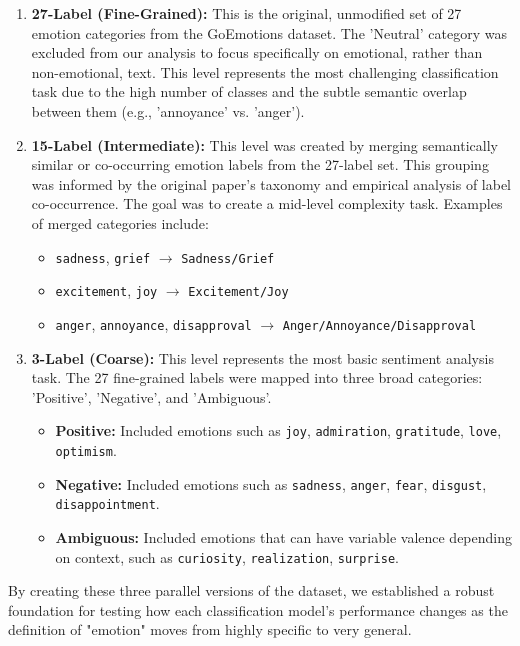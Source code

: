 \begin{enumerate}
    \item \textbf{27-Label (Fine-Grained):} This is the original, unmodified set of 27 emotion categories from the GoEmotions dataset. The 'Neutral' category was excluded from our analysis to focus specifically on emotional, rather than non-emotional, text. This level represents the most challenging classification task due to the high number of classes and the subtle semantic overlap between them (e.g., 'annoyance' vs. 'anger').

    \item \textbf{15-Label (Intermediate):} This level was created by merging semantically similar or co-occurring emotion labels from the 27-label set. This grouping was informed by the original paper's taxonomy and empirical analysis of label co-occurrence. The goal was to create a mid-level complexity task. Examples of merged categories include:
    \begin{itemize}
        \item \texttt{sadness}, \texttt{grief} $\rightarrow$ \texttt{Sadness/Grief}
        \item \texttt{excitement}, \texttt{joy} $\rightarrow$ \texttt{Excitement/Joy}
        \item \texttt{anger}, \texttt{annoyance}, \texttt{disapproval} $\rightarrow$ \texttt{Anger/Annoyance/Disapproval}
    \end{itemize}

    \item \textbf{3-Label (Coarse):} This level represents the most basic sentiment analysis task. The 27 fine-grained labels were mapped into three broad categories: 'Positive', 'Negative', and 'Ambiguous'.
    \begin{itemize}
        \item \textbf{Positive:} Included emotions such as \texttt{joy}, \texttt{admiration}, \texttt{gratitude}, \texttt{love}, \texttt{optimism}.
        \item \textbf{Negative:} Included emotions such as \texttt{sadness}, \texttt{anger}, \texttt{fear}, \texttt{disgust}, \texttt{disappointment}.
        \item \textbf{Ambiguous:} Included emotions that can have variable valence depending on context, such as \texttt{curiosity}, \texttt{realization}, \texttt{surprise}.
    \end{itemize}
\end{enumerate}

By creating these three parallel versions of the dataset, we established a robust foundation for testing how each classification model's performance changes as the definition of "emotion" moves from highly specific to very general.